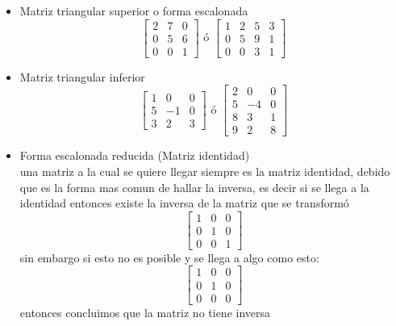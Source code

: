 \begin{itemize}
	\item Matriz triangular superior o forma escalonada
	$$
	\begin{bmatrix}
		2&7&0\\
		0&5&6\\
		0&0&1
	\end{bmatrix} \text{ ó } \begin{bmatrix}
		1&2&5&3\\
		0&5&9&1\\
		0&0&3&1
	\end{bmatrix}
	$$
	\item  Matriz triangular inferior
	$$
	\begin{bmatrix}
		1&0&0\\
		5&-1&0\\
		3&2&3
	\end{bmatrix} \text{ ó } \begin{bmatrix}
		2&0&0\\
		5&-4&0\\
		8&3&1\\
		9&2&8
	\end{bmatrix}
	$$
	\item Forma escalonada reducida (Matriz identidad)\\
	una matriz a la cual se quiere llegar siempre es la matriz identidad, debido que es la forma mas comun de hallar la inversa, es decir si se llega a la identidad entonces existe la inversa de la matriz que se transformó
	$$
	\begin{bmatrix}
		1&0&0\\
		0&1&0\\
		0&0&1
	\end{bmatrix}
	$$
	sin embargo si esto no es posible y se llega a algo como esto:
	$$
	\begin{bmatrix}
		1&0&0\\
		0&1&0\\
		0&0&0
	\end{bmatrix}
	$$
	entonces concluimos que la matriz no tiene inversa
\end{itemize}
